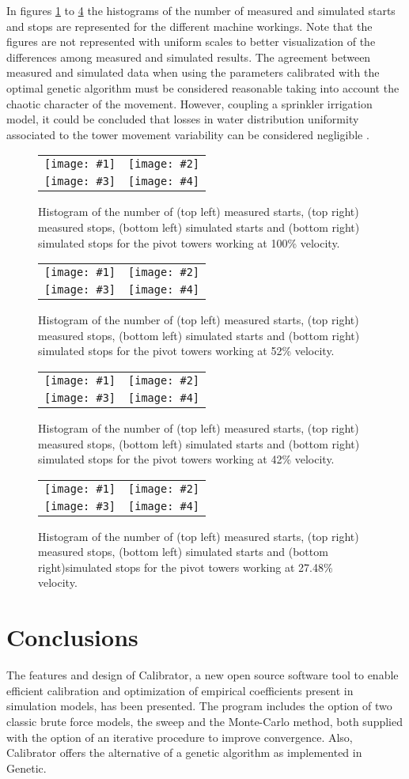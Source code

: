 \documentclass[review,authoryear]{elsarticle}
\newcommand{\FIGIV}[6]
{
	\begin{figure}[ht!]
		\centering
		\begin{tabular}{cc}
			\texttt{[image: \#1]} & \texttt{[image: \#2]} \\
			\texttt{[image: \#3]} & \texttt{[image: \#4]}
		\end{tabular}
		\caption{#5.\label{#6}}
	\end{figure}
}
\begin{document}
In figures \ref{FigPivot100} to \ref{FigPivot27} the histograms of the number
of measured and simulated starts and stops are represented for the different
machine workings.
Note that the figures are not represented with uniform scales to better
visualization of the differences among measured and simulated results.
The agreement between measured and simulated data when using the parameters calibrated with the optimal genetic algorithm must be considered reasonable taking into account the chaotic character of the movement.
However, coupling a sprinkler irrigation model, it could be concluded that losses in water distribution uniformity associated to the tower movement variability can be considered negligible \citep{Ouazaa15}.

\FIGIV{pivot-measured-starts-100.eps}{pivot-measured-stops-100.eps}
{pivot-simulated-starts-100.eps}{pivot-simulated-stops-100.eps}
{Histogram of the number of (top left) measured starts, (top right) measured stops, (bottom left)
simulated starts and (bottom right) simulated stops for the pivot towers working at 100\%
velocity}{FigPivot100}

\FIGIV{pivot-measured-starts-52.eps}{pivot-measured-stops-52.eps}
{pivot-simulated-starts-52.eps}{pivot-simulated-stops-52.eps}
{Histogram of the number of (top left) measured starts, (top right) measured stops, (bottom left)
simulated starts and (bottom right) simulated stops for the pivot towers working at 52\%
velocity}{FigPivot52}

\FIGIV{pivot-measured-starts-42.eps}{pivot-measured-stops-42.eps}
{pivot-simulated-starts-42.eps}{pivot-simulated-stops-42.eps}
{Histogram of the number of (top left) measured starts, (top right) measured stops, (bottom left)
simulated starts and (bottom right) simulated stops for the pivot towers working at 42\%
velocity}{FigPivot42}

\FIGIV{pivot-measured-starts-27,48.eps}{pivot-measured-stops-27,48.eps}
{pivot-simulated-starts-27,48.eps}{pivot-simulated-stops-27,48.eps}
{Histogram of the number of (top left) measured starts, (top right) measured stops, (bottom left)
simulated starts and (bottom right)simulated stops for the pivot towers working at 27.48\% velocity}{FigPivot27}

\section{Conclusions}

The features and design of Calibrator, a new open source software tool to enable efficient calibration and optimization of empirical coefficients present in simulation models, has been presented. The program includes the option of two classic brute force models, the sweep and the Monte-Carlo method, both supplied with the option of an iterative procedure to improve convergence. Also, Calibrator offers the alternative of a genetic algorithm as implemented in Genetic.
\end{document}
